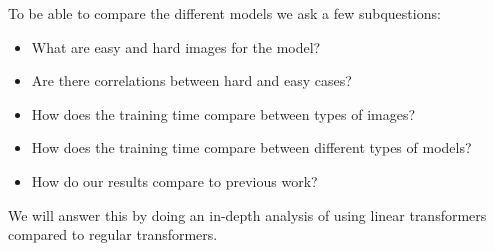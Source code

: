To be able to compare the different models we ask a few subquestions:
\begin{itemize}
    \item What are easy and hard images for the model?
    \item Are there correlations between hard and easy cases?
    \item How does the training time compare between types of images?
    \item How does the training time compare between different types of models?
    \item How do our results compare to previous work?
\end{itemize}

We will answer this by doing an in-depth analysis of using linear transformers compared to regular transformers.

